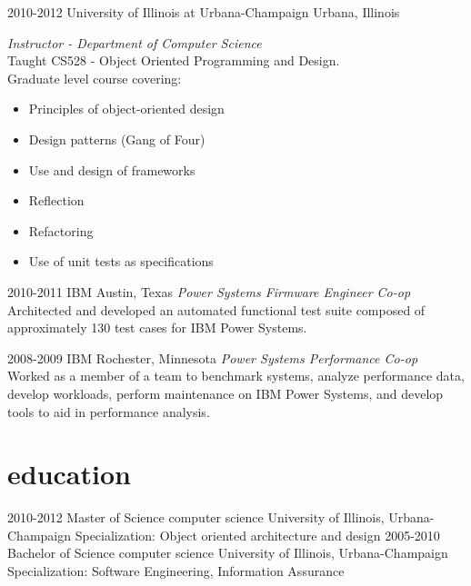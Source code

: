 \documentclass{friggeri-cv} %
\begin{document}
\begin{entrylist}
\entry
{2010-2012}
{University of Illinois at Urbana-Champaign}
{Urbana, Illinois}
{\emph{Instructor - Department of Computer Science} \\
Taught CS528 - Object Oriented Programming and Design. \\
Graduate level course covering:
\begin{itemize}
\item Principles of object-oriented design
\item Design patterns (Gang of Four)
\item Use and design of frameworks
\item Reflection
\item Refactoring
\item Use of unit tests as specifications
\end{itemize}}
\end{entrylist}
\begin{entrylist}
\entry
{2010-2011}
{IBM}
{Austin, Texas}
{\emph{Power Systems Firmware Engineer Co-op} \\
Architected and developed an automated functional test suite composed of approximately 130 test cases for IBM Power Systems.}
\end{entrylist}
\begin{entrylist}
\entry
{2008-2009}
{IBM}
{Rochester, Minnesota}
{\emph{Power Systems Performance Co-op} \\
Worked as a member of a team to benchmark systems, analyze performance data, develop workloads, perform maintenance on IBM Power Systems, and develop tools to aid in performance analysis. }
\end{entrylist}


\section{education}

\begin{entrylist}
\entry
{2010-2012}
{Master of Science {\normalfont computer science}}
{University of Illinois, Urbana-Champaign}
{Specialization: Object oriented architecture and design}
\entry
{2005-2010}
{Bachelor of Science {\normalfont computer science}}
{University of Illinois, Urbana-Champaign}
{Specialization: Software Engineering, Information Assurance}
\end{entrylist}
\end{document}
